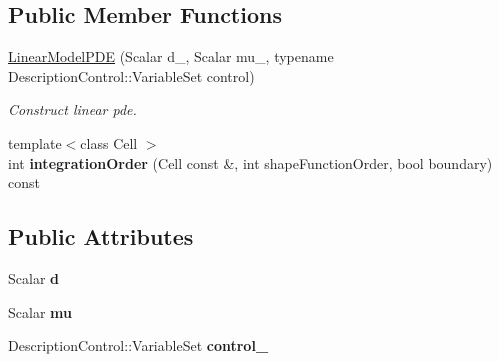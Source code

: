 \subsection*{Public Member Functions}
\begin{DoxyCompactItemize}
\item 
\hyperlink{classKaskade_1_1LinearModelPDE_aadf33387bd0274cc8166e3468e6d5006}{Linear\-Model\-P\-D\-E} (Scalar d\-\_\-, Scalar mu\-\_\-, typename Description\-Control\-::\-Variable\-Set control)
\begin{DoxyCompactList}\small\item\em Construct linear pde. \end{DoxyCompactList}\item 
\hypertarget{classKaskade_1_1LinearModelPDE_aa2e189d5980b11f99905448fe424b813}{{\footnotesize template$<$class Cell $>$ }\\int {\bfseries integration\-Order} (Cell const \&, int shape\-Function\-Order, bool boundary) const }\label{classKaskade_1_1LinearModelPDE_aa2e189d5980b11f99905448fe424b813}

\end{DoxyCompactItemize}
\subsection*{Public Attributes}
\begin{DoxyCompactItemize}
\item 
\hypertarget{classKaskade_1_1LinearModelPDE_a5ac8a5faad7a6f32ea4f80b3d4f0afa3}{Scalar {\bfseries d}}\label{classKaskade_1_1LinearModelPDE_a5ac8a5faad7a6f32ea4f80b3d4f0afa3}

\item 
\hypertarget{classKaskade_1_1LinearModelPDE_a543fa1e9af6ed6ea41ede32d97a8e21a}{Scalar {\bfseries mu}}\label{classKaskade_1_1LinearModelPDE_a543fa1e9af6ed6ea41ede32d97a8e21a}

\item 
\hypertarget{classKaskade_1_1LinearModelPDE_abd838b13dd8222b8b6f342d8154c2989}{Description\-Control\-::\-Variable\-Set {\bfseries control\-\_\-}}\label{classKaskade_1_1LinearModelPDE_abd838b13dd8222b8b6f342d8154c2989}

\end{DoxyCompactItemize}
